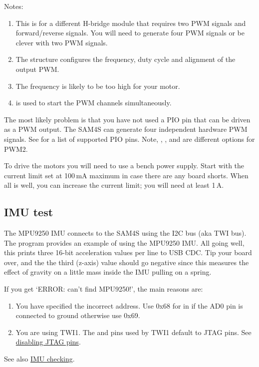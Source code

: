 Notes:
%
\begin{enumerate}
\item
  This is for a different H-bridge module that requires two PWM signals
  and forward/reverse signals. You will need to generate four PWM
  signals or be clever with two PWM signals.
\item
  The  structure configures the frequency, duty
  cycle and alignment of the output PWM.
\item The frequency is likely to be too high for your motor.
\item {} is used to start the PWM channels simultaneously.  
\end{enumerate}

The most likely problem is that you have not used a PIO pin that can
be driven as a PWM output. The SAM4S can generate four independent
hardware PWM signals. See  for a list of
supported PIO pins. Note, , , and  are
different options for PWM2.

To drive the motors you will need to use a bench power supply. Start
with the current limit set at 100\,mA maximum in case there are any
board shorts.  When all is well, you can increase the current limit;
you will need at least 1\,A.

\subsection{IMU test}
\label{imu-test}

The MPU9250 IMU connects to the SAM4S using the I2C bus (aka TWI bus).
The program  provides an
example of using the MPU9250 IMU.  All going well, this prints three
16-bit acceleration values per line to USB CDC. Tip your board over,
and the the third (z-axis) value should go negative since this
measures the effect of gravity on a little mass inside the IMU pulling
on a spring.

If you get `ERROR: can't find MPU9250!', the main reasons are:

\begin{enumerate}
\item
  You have specified the incorrect address.  Use 0x68 for
   in  if the AD0 pin is connected to
  ground otherwise use 0x69.
\item
  You are using TWI1. The  and  pins used by TWI1
  default to JTAG pins. See
  \protect\hyperref[disabling-jtag-pins]{disabling JTAG pins}.
\end{enumerate}
%
See also \protect\hyperref[checking-IMU]{IMU checking}.

